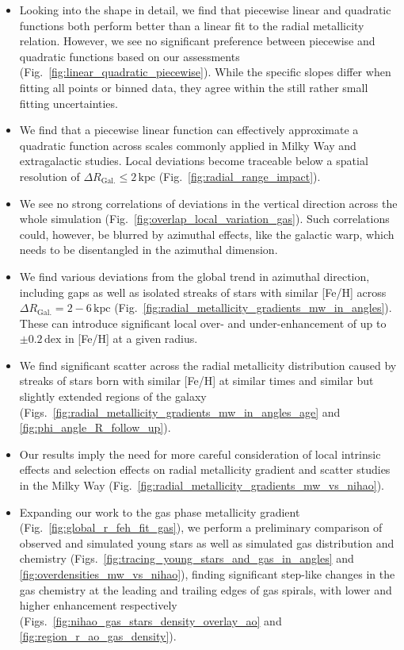 \documentclass[twocolumn,apj,numberedappendix,appendixfloats,twocolappendix]{openjournal}
\begin{document}
\begin{CJK*}{UTF8}{gbsn}
\begin{itemize}%
    \item Looking into the shape in detail, we find that piecewise linear and quadratic functions both perform better than a linear fit to the radial metallicity relation. However, we see no significant preference between piecewise and quadratic functions based on our assessments (Fig.~\ref{fig:linear_quadratic_piecewise}). While the specific slopes differ when fitting all points or binned data, they agree within the still rather small fitting uncertainties.
    \item We find that a piecewise linear function can effectively approximate a quadratic function across scales commonly applied in Milky Way and extragalactic studies. Local deviations become traceable below a spatial resolution of $\Delta R_\mathrm{Gal.} \leq 2\,\mathrm{kpc}$ (Fig.~\ref{fig:radial_range_impact}).
    \item We see no strong correlations of deviations in the vertical direction across the whole simulation (Fig.~\ref{fig:overlap_local_variation_gas}). Such correlations could, however, be blurred by azimuthal effects, like the galactic warp, which needs to be disentangled in the azimuthal dimension. 
    \item We find various deviations from the global trend in azimuthal direction, including gaps as well as isolated streaks of stars with similar [Fe/H] across $\Delta R_\mathrm{Gal.} = 2-6\,\mathrm{kpc}$ (Fig.~\ref{fig:radial_metallicity_gradients_mw_in_angles}). These can introduce significant local over- and under-enhancement of up to $\pm 0.2\,\mathrm{dex}$ in [Fe/H] at a given radius.
    \item We find significant scatter across the radial metallicity distribution caused by streaks of stars born with similar [Fe/H] at similar times and similar but slightly extended regions of the galaxy (Figs.~\ref{fig:radial_metallicity_gradients_mw_in_angles_age} and \ref{fig:phi_angle_R_follow_up}).
    \item Our results imply the need for more careful consideration of local intrinsic effects and selection effects on radial metallicity gradient and scatter studies in the Milky Way (Fig.~\ref{fig:radial_metallicity_gradients_mw_vs_nihao}).
    \item Expanding our work to the gas phase metallicity gradient (Fig.~\ref{fig:global_r_feh_fit_gas}), we perform a preliminary comparison of observed and simulated young stars as well as simulated gas distribution and chemistry (Figs.~\ref{fig:tracing_young_stars_and_gas_in_angles} and \ref{fig:overdensities_mw_vs_nihao}), finding significant step-like changes in the gas chemistry at the leading and trailing edges of gas spirals, with lower and higher enhancement respectively (Figs.~\ref{fig:nihao_gas_stars_density_overlay_ao} and \ref{fig:region_r_ao_gas_density}).

\end{itemize}
\end{CJK*}
\end{document}
